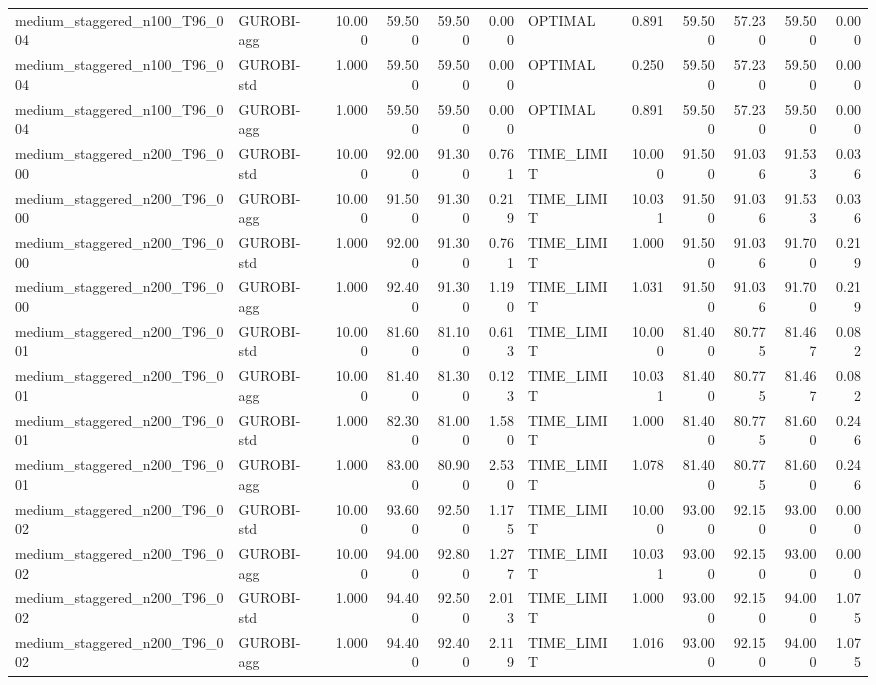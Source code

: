 \begin{table}[htbp]
\begin{tabular}{llrrrrlrrrrr}
medium\_staggered\_n100\_T96\_004 & GUROBI-agg & 10.000 & 59.500 & 59.500 & 0.000 & OPTIMAL & 0.891 & 59.500 & 57.230 & 59.500 & 0.000 \\
medium\_staggered\_n100\_T96\_004 & GUROBI-std & 1.000 & 59.500 & 59.500 & 0.000 & OPTIMAL & 0.250 & 59.500 & 57.230 & 59.500 & 0.000 \\
medium\_staggered\_n100\_T96\_004 & GUROBI-agg & 1.000 & 59.500 & 59.500 & 0.000 & OPTIMAL & 0.891 & 59.500 & 57.230 & 59.500 & 0.000 \\
medium\_staggered\_n200\_T96\_000 & GUROBI-std & 10.000 & 92.000 & 91.300 & 0.761 & TIME\_LIMIT & 10.000 & 91.500 & 91.036 & 91.533 & 0.036 \\
medium\_staggered\_n200\_T96\_000 & GUROBI-agg & 10.000 & 91.500 & 91.300 & 0.219 & TIME\_LIMIT & 10.031 & 91.500 & 91.036 & 91.533 & 0.036 \\
medium\_staggered\_n200\_T96\_000 & GUROBI-std & 1.000 & 92.000 & 91.300 & 0.761 & TIME\_LIMIT & 1.000 & 91.500 & 91.036 & 91.700 & 0.219 \\
medium\_staggered\_n200\_T96\_000 & GUROBI-agg & 1.000 & 92.400 & 91.300 & 1.190 & TIME\_LIMIT & 1.031 & 91.500 & 91.036 & 91.700 & 0.219 \\
medium\_staggered\_n200\_T96\_001 & GUROBI-std & 10.000 & 81.600 & 81.100 & 0.613 & TIME\_LIMIT & 10.000 & 81.400 & 80.775 & 81.467 & 0.082 \\
medium\_staggered\_n200\_T96\_001 & GUROBI-agg & 10.000 & 81.400 & 81.300 & 0.123 & TIME\_LIMIT & 10.031 & 81.400 & 80.775 & 81.467 & 0.082 \\
medium\_staggered\_n200\_T96\_001 & GUROBI-std & 1.000 & 82.300 & 81.000 & 1.580 & TIME\_LIMIT & 1.000 & 81.400 & 80.775 & 81.600 & 0.246 \\
medium\_staggered\_n200\_T96\_001 & GUROBI-agg & 1.000 & 83.000 & 80.900 & 2.530 & TIME\_LIMIT & 1.078 & 81.400 & 80.775 & 81.600 & 0.246 \\
medium\_staggered\_n200\_T96\_002 & GUROBI-std & 10.000 & 93.600 & 92.500 & 1.175 & TIME\_LIMIT & 10.000 & 93.000 & 92.150 & 93.000 & 0.000 \\
medium\_staggered\_n200\_T96\_002 & GUROBI-agg & 10.000 & 94.000 & 92.800 & 1.277 & TIME\_LIMIT & 10.031 & 93.000 & 92.150 & 93.000 & 0.000 \\
medium\_staggered\_n200\_T96\_002 & GUROBI-std & 1.000 & 94.400 & 92.500 & 2.013 & TIME\_LIMIT & 1.000 & 93.000 & 92.150 & 94.000 & 1.075 \\
medium\_staggered\_n200\_T96\_002 & GUROBI-agg & 1.000 & 94.400 & 92.400 & 2.119 & TIME\_LIMIT & 1.016 & 93.000 & 92.150 & 94.000 & 1.075 \\

\end{tabular}
\end{table}
